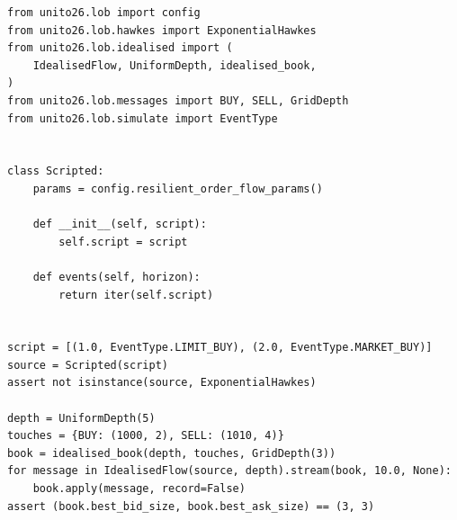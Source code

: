 \begin{lstlisting}[caption={A scripted source of events in the place of the process.}, label=listing.scriptedSource]
from unito26.lob import config
from unito26.lob.hawkes import ExponentialHawkes
from unito26.lob.idealised import (
    IdealisedFlow, UniformDepth, idealised_book,
)
from unito26.lob.messages import BUY, SELL, GridDepth
from unito26.lob.simulate import EventType


class Scripted:
    params = config.resilient_order_flow_params()

    def __init__(self, script):
        self.script = script

    def events(self, horizon):
        return iter(self.script)


script = [(1.0, EventType.LIMIT_BUY), (2.0, EventType.MARKET_BUY)]
source = Scripted(script)
assert not isinstance(source, ExponentialHawkes)

depth = UniformDepth(5)
touches = {BUY: (1000, 2), SELL: (1010, 4)}
book = idealised_book(depth, touches, GridDepth(3))
for message in IdealisedFlow(source, depth).stream(book, 10.0, None):
    book.apply(message, record=False)
assert (book.best_bid_size, book.best_ask_size) == (3, 3)
\end{lstlisting}
